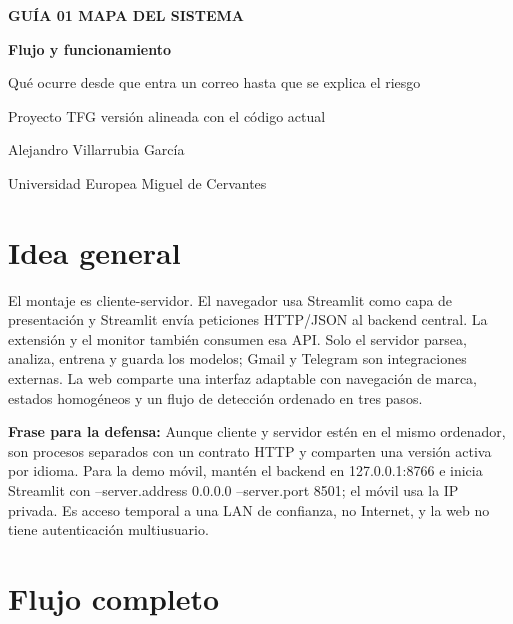 \documentclass[11pt,a4paper]{article}
\begin{document}
\hypersetup{pageanchor=false}
\begin{titlepage}
  \centering
  \vspace*{2.4cm}
  {\Large\color{uemcgreen}\textbf{GUÍA 01 \textperiodcentered{} MAPA DEL SISTEMA}\par}
  \vspace{1.5cm}
  {\Huge\bfseries\color{uemcgreen}Flujo y funcionamiento\par}
  \vspace{0.7cm}
  {\large\color{tfgblue}Qué ocurre desde que entra un correo hasta que se explica el riesgo\par}
  \vfill
  {\large Proyecto TFG \textperiodcentered{} versión alineada con el código actual\par}
  \vspace{0.35cm}
  {\large Alejandro Villarrubia García\par}
  \vspace{0.35cm}
  {\large Universidad Europea Miguel de Cervantes\par}
\end{titlepage}
\hypersetup{pageanchor=true}
\tableofcontents
\clearpage

\section{Idea general}

El montaje es cliente-servidor. El navegador usa Streamlit como capa de presentación y Streamlit envía peticiones HTTP/\allowbreak{}JSON al backend central. La extensión y el monitor también consumen esa API. Solo el servidor parsea, analiza, entrena y guarda los modelos; Gmail y Telegram son integraciones externas. La web comparte una interfaz adaptable con navegación de marca, estados homogéneos y un flujo de detección ordenado en tres pasos.

\begin{tcolorbox}[colback=uemclight,colframe=uemcgreen,title=Nota para la defensa]
\textbf{Frase para la defensa:} Aunque cliente y servidor estén en el mismo ordenador, son procesos separados con un contrato HTTP y comparten una versión activa por idioma. Para la demo móvil, mantén el backend en 127.0.0.1:8766 e inicia Streamlit con --server.address 0.0.0.0 --server.port 8501; el móvil usa la IP privada. Es acceso temporal a una LAN de confianza, no Internet, y la web no tiene autenticación multiusuario.
\end{tcolorbox}

\section{Flujo completo}
\end{document}
